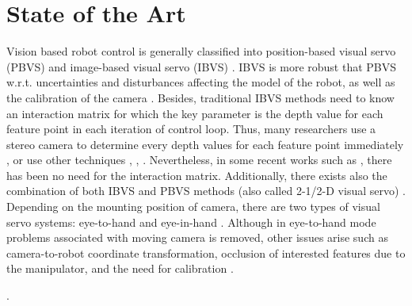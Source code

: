 \newpage 
\section*{State of the Art}

Vision based robot control is generally classified into position-based visual servo (PBVS) and image-based visual servo (IBVS) \cite{janabi2011comparison}. IBVS is more robust that PBVS w.r.t. uncertainties and disturbances affecting the model of the robot, as well as the calibration of the camera \cite{malis2003robustness}. Besides, traditional IBVS methods need to know an interaction matrix for which the key parameter is  the depth value for each feature point in each iteration of control loop. Thus, many researchers use a stereo camera to determine every depth values for each feature point immediately \cite{wang2014modified}, or use other techniques \cite{luo2014hybrid}, \cite{zhong2015robots}, \cite{kosmopoulos2011robust}. Nevertheless, in some recent works such as \cite{tongloy2016image}, there has been no need for the interaction matrix. Additionally, there exists also the combination of both IBVS and PBVS methods (also called 2-1/2-D visual servo) \cite{malis19992}. \\
Depending on the mounting position of camera, there are two types of visual servo systems: eye-to-hand and eye-in-hand \cite{dong2015position}. Although in eye-to-hand mode problems associated with moving camera is removed, other issues arise such as camera-to-robot coordinate transformation, occlusion of interested features due to the manipulator, and the need for calibration \cite{smith1996vision}. 






.  
